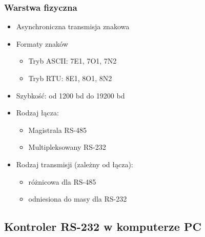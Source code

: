 		\subsubsection{Warstwa fizyczna}
		\begin{itemize}
			\item Asynchroniczna transmisja znakowa
			\item Formaty znaków
			\begin{itemize}
				\item Tryb ASCII: 7E1, 7O1, 7N2
				\item Tryb RTU: 8E1, 8O1, 8N2
			\end{itemize}
			\item Szybkość: od 1200 bd do 19200 bd
			\item Rodzaj łącza:
			\begin{itemize}
				\item Magistrala RS-485
				\item Multipleksowany RS-232
			\end{itemize}
			\item Rodzaj transmisji (zależny od łącza):
			\begin{itemize}
				\item różnicowa dla RS-485
				\item odniesiona do masy dla RS-232
			\end{itemize}
		\end{itemize}
	\subsection{Kontroler RS-232 w komputerze PC}